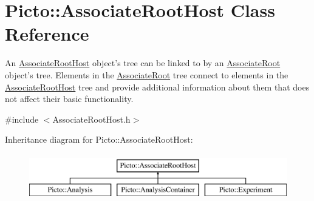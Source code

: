 \hypertarget{class_picto_1_1_associate_root_host}{\section{Picto\-:\-:Associate\-Root\-Host Class Reference}
\label{class_picto_1_1_associate_root_host}
}


An \hyperlink{class_picto_1_1_associate_root_host}{Associate\-Root\-Host} object's tree can be linked to by an \hyperlink{class_picto_1_1_associate_root}{Associate\-Root} object's tree. Elements in the \hyperlink{class_picto_1_1_associate_root}{Associate\-Root} tree connect to elements in the \hyperlink{class_picto_1_1_associate_root_host}{Associate\-Root\-Host} tree and provide additional information about them that does not affect their basic functionality.  




{\ttfamily \#include $<$Associate\-Root\-Host.\-h$>$}

Inheritance diagram for Picto\-:\-:Associate\-Root\-Host\-:\begin{figure}[H]
\begin{center}
\leavevmode
\includegraphics[height=2.000000cm]{class_picto_1_1_associate_root_host}
\end{center}
\end{figure}
